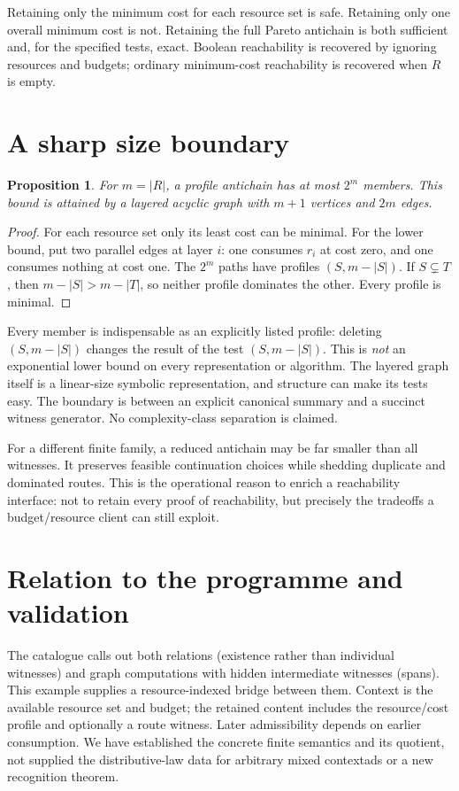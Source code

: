 \documentclass[11pt]{article}
\newtheorem{proposition}{Proposition}
\begin{document}
Retaining only the minimum cost for each resource set is safe. Retaining only one overall minimum cost is not. Retaining the full Pareto antichain is both sufficient and, for the specified tests, exact. Boolean reachability is recovered by ignoring resources and budgets; ordinary minimum-cost reachability is recovered when $R$ is empty.
\section{A sharp size boundary}
\begin{proposition}
For $m=|R|$, a profile antichain has at most $2^m$ members. This bound is attained by a layered acyclic graph with $m+1$ vertices and $2m$ edges.
\end{proposition}
\begin{proof}
For each resource set only its least cost can be minimal. For the lower bound, put two parallel edges at layer $i$: one consumes $r_i$ at cost zero, and one consumes nothing at cost one. The $2^m$ paths have profiles $(S,m-|S|)$. If $S\subsetneq T$, then $m-|S|>m-|T|$, so neither profile dominates the other. Every profile is minimal.
\end{proof}
Every member is indispensable as an explicitly listed profile: deleting $(S,m-|S|)$ changes the result of the test $(S,m-|S|)$. This is \emph{not} an exponential lower bound on every representation or algorithm. The layered graph itself is a linear-size symbolic representation, and structure can make its tests easy. The boundary is between an explicit canonical summary and a succinct witness generator. No complexity-class separation is claimed.

For a different finite family, a reduced antichain may be far smaller than all witnesses. It preserves feasible continuation choices while shedding duplicate and dominated routes. This is the operational reason to enrich a reachability interface: not to retain every proof of reachability, but precisely the tradeoffs a budget/resource client can still exploit.
\section{Relation to the programme and validation}
The catalogue calls out both relations (existence rather than individual witnesses) and graph computations with hidden intermediate witnesses (spans). This example supplies a resource-indexed bridge between them. Context is the available resource set and budget; the retained content includes the resource/cost profile and optionally a route witness. Later admissibility depends on earlier consumption. We have established the concrete finite semantics and its quotient, not supplied the distributive-law data for arbitrary mixed contextads or a new recognition theorem.
\end{document}
